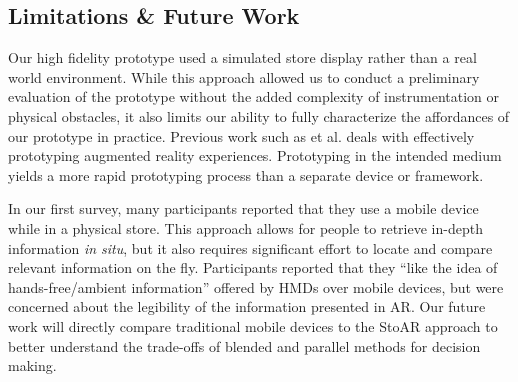 \subsection{Limitations \& Future Work}
Our high fidelity prototype used a simulated store display rather than a real world environment.  While this approach allowed us to conduct a preliminary evaluation of the prototype without the added complexity of instrumentation or physical obstacles, it also limits our ability to fully characterize the affordances of our prototype in practice. Previous work such as et al. \cite{macintyre2004dart} deals with effectively prototyping augmented reality experiences. Prototyping in the intended medium yields a more rapid prototyping process than a separate device or framework.

In our first survey, many participants reported that they use a mobile device while in a physical store. This approach allows for people to retrieve in-depth information \emph{in situ}, but it also requires significant effort to locate and compare relevant information on the fly. Participants reported that they ``like the idea of hands-free/ambient information'' offered by HMDs over mobile devices, but were concerned about the legibility of the information presented in AR. Our future work will directly compare traditional mobile devices to the StoAR approach to better understand the trade-offs of blended and parallel methods for decision making. 

